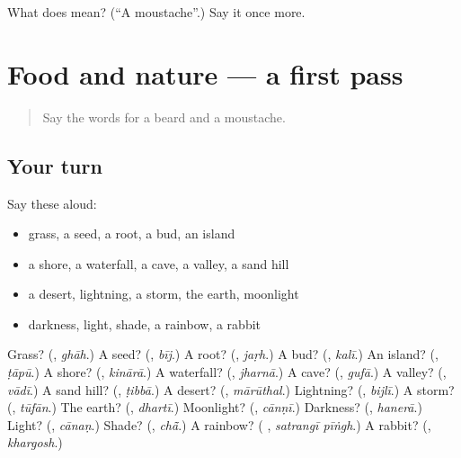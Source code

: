 \begin{tcolorbox}[breakable,colback=teal!4,colframe=teal!35!black,title={Before you move on}]
What does  mean? (\textquotedblleft{}A moustache\textquotedblright{}.) Say it once more.
\end{tcolorbox}
\section[(dialogue)]{Food and nature — a first pass}

\label{lesson:PA-R134-first-pass-food-and-nature}



\begin{quote}
Say the words for a beard and a moustache.
\end{quote}

\subsection*{Your turn}
Say these aloud:

\begin{itemize}
\raggedright
  \item grass, a seed, a root, a bud, an island
  \item a shore, a waterfall, a cave, a valley, a sand hill
  \item a desert, lightning, a storm, the earth, moonlight
  \item darkness, light, shade, a rainbow, a rabbit
\end{itemize}

\begin{tcolorbox}[breakable,colback=teal!4,colframe=teal!35!black,title={Before you move on}]
Grass? (\textbf{}, \emph{ghāh}.) A seed? (\textbf{}, \emph{bīj}.) A root? (\textbf{}, \emph{jaṛh}.) A bud? (\textbf{}, \emph{kalī}.) An island? (\textbf{}, \emph{ṭāpū}.) A shore? (\textbf{}, \emph{kinārā}.) A waterfall? (\textbf{}, \emph{jharnā}.) A cave? (\textbf{}, \emph{gufā}.) A valley? (\textbf{}, \emph{vādī}.) A sand hill? (\textbf{}, \emph{ṭibbā}.) A desert? (\textbf{}, \emph{mārūthal}.) Lightning? (\textbf{}, \emph{bijlī}.) A storm? (\textbf{}, \emph{tūfān}.) The earth? (\textbf{}, \emph{dhartī}.) Moonlight? (\textbf{}, \emph{cānṇī}.) Darkness? (\textbf{}, \emph{hanerā}.) Light? (\textbf{}, \emph{cānaṇ}.) Shade? (\textbf{}, \emph{chā̃}.) A rainbow? (\textbf{ }, \emph{satrangī pīṅgh}.) A rabbit? (\textbf{}, \emph{khargosh}.)
\end{tcolorbox}
